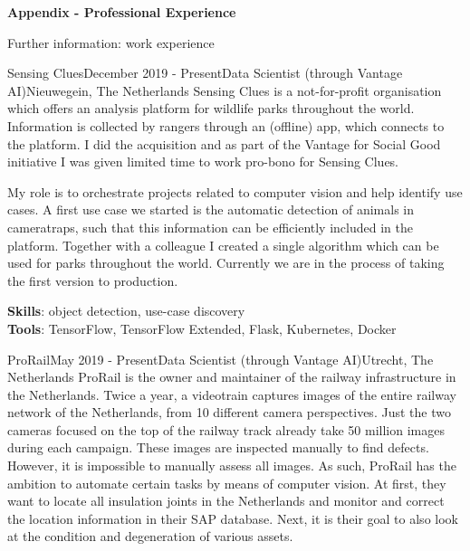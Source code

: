\hfil{\Large{\bf Appendix - Professional Experience}}\hfil\\
\nameskip\break


\begin{rSection}{Further information: work experience}
\begin{rSubsection}{Sensing Clues}{December 2019 - Present}{Data Scientist (through Vantage AI)}{Nieuwegein, The Netherlands}
Sensing Clues is a not-for-profit organisation which offers an analysis platform for wildlife parks throughout the world. 
Information is collected by rangers through an (offline) app, which connects to the platform.
I did the acquisition and as part of the Vantage for Social Good initiative I was given limited time to work pro-bono for Sensing Clues.

My role is to orchestrate projects related to computer vision and help identify use cases.
A first use case we started is the automatic detection of animals in cameratraps, such that this information can be efficiently included in the platform.
Together with a colleague I created a single algorithm which can be used for parks throughout the world. 
Currently we are in the process of taking the first version to production.

{\bf Skills}: object detection, use-case discovery\\
{\bf Tools}: TensorFlow, TensorFlow Extended, Flask, Kubernetes, Docker
\end{rSubsection}

\begin{rSubsection}{ProRail}{May 2019 - Present}{Data Scientist (through Vantage AI)}{Utrecht, The Netherlands}
ProRail is the owner and maintainer of the railway infrastructure in the Netherlands.
Twice a year, a videotrain captures images of the entire railway network of the Netherlands, from 10 different 
camera perspectives. 
Just the two cameras focused on the top of the railway track already take 50 million images during each campaign.
These images are inspected manually to find defects. However, it is impossible to manually assess all images.
As such, ProRail has the ambition to automate certain tasks by means of computer vision.
At first, they want to locate all insulation joints in the Netherlands and monitor and correct the location information in
their SAP database. Next, it is their goal to also look at the condition and degeneration of various assets.


\end{rSubsection}
\end{rSection}
